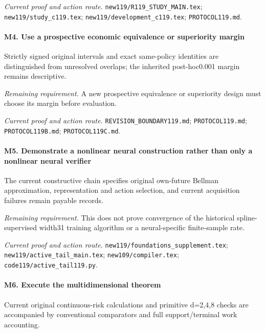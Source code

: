 \par\emph{Current proof and action route.} \nolinkurl{new119/R119_STUDY_MAIN.tex}; \nolinkurl{new119/study_c119.tex}; \nolinkurl{new119/development_c119.tex}; \nolinkurl{PROTOCOL119.md}.

\paragraph{M4. Use a prospective economic equivalence or superiority margin}

Strictly signed original intervals and exact same-policy identities are distinguished from unresolved overlaps; the inherited post-hoc0.001 margin remains descriptive.

\par\emph{Remaining requirement.} A new prospective equivalence or superiority design must choose its margin before evaluation.

\par\emph{Current proof and action route.} \nolinkurl{REVISION_BOUNDARY119.md}; \nolinkurl{PROTOCOL119.md}; \nolinkurl{PROTOCOL119B.md}; \nolinkurl{PROTOCOL119C.md}.

\paragraph{M5. Demonstrate a nonlinear neural construction rather than only a nonlinear neural verifier}

The current constructive chain specifies original own-future Bellman approximation, representation and action selection, and current acquisition failures remain payable records.

\par\emph{Remaining requirement.} This does not prove convergence of the historical spline-supervised width31 training algorithm or a neural-specific finite-sample rate.

\par\emph{Current proof and action route.} \nolinkurl{new119/foundations_supplement.tex}; \nolinkurl{new119/active_tail_main.tex}; \nolinkurl{new109/compiler.tex}; \nolinkurl{code119/active_tail119.py}.

\paragraph{M6. Execute the multidimensional theorem}

Current original continuous-risk calculations and primitive d=2,4,8 checks are accompanied by conventional comparators and full support/\allowbreak{}terminal work accounting.


